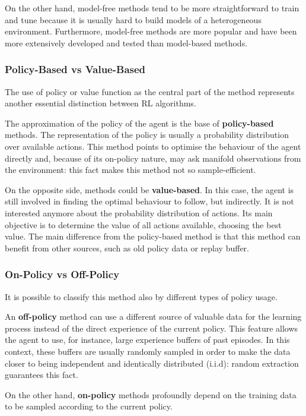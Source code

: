 On the other hand, model-free methods tend to be more straightforward to train and tune because it is usually hard to build models of a heterogeneous environment. Furthermore, model-free methods are more popular and have been more extensively developed and tested than model-based methods.

\subsubsection{Policy-Based vs Value-Based}

The use of policy or value function as the central part of the method represents another essential distinction between RL algorithms.

The approximation of the policy of the agent is the base of \textbf{policy-based} methods. The representation of the policy is usually a probability distribution over available actions. This method points to optimise the behaviour of the agent directly and, because of its on-policy nature, may ask manifold observations from the environment: this fact makes this method not so sample-efficient.

On the opposite side, methods could be \textbf{value-based}. In this case, the agent is still involved in finding the optimal behaviour to follow, but indirectly. It is not interested anymore about the probability distribution of actions. Its main objective is to determine the value of all actions available, choosing the best value. The main difference from the policy-based method is that this method can benefit from other sources, such as old policy data or replay buffer.

\subsubsection{On-Policy vs Off-Policy}

It is possible to classify this method also by different types of policy usage.

An \textbf{off-policy} method can use a different source of valuable data for the learning process instead of the direct experience of the current policy. This feature allows the agent to use, for instance, large experience buffers of past episodes. In this context, these buffers are usually randomly sampled in order to make the data closer to being independent and identically distributed (i.i.d): random extraction guarantees this fact.

On the other hand, \textbf{on-policy} methods profoundly depend on the training data to be sampled according to the current policy.

